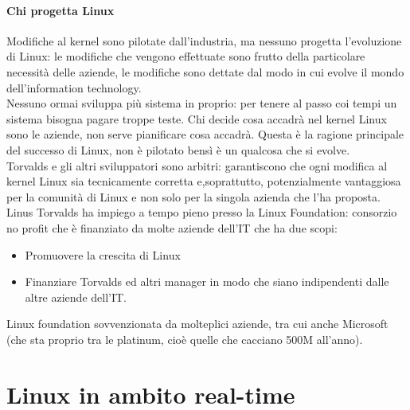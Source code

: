 \documentclass[12pt, oneside]{extbook}
\begin{document}
\subsubsection{Chi progetta Linux}
Modifiche al kernel sono pilotate dall'industria, ma nessuno progetta l'evoluzione di Linux: le modifiche che vengono effettuate sono frutto della particolare necessità delle aziende, le modifiche sono dettate dal modo in cui evolve il mondo dell'information technology.\\ Nessuno ormai sviluppa più sistema in proprio: per tenere al passo coi tempi un sistema bisogna pagare troppe teste. Chi decide cosa accadrà nel kernel Linux sono le aziende, non serve pianificare cosa accadrà. Questa è la ragione principale del successo di Linux, non è pilotato bensì è un qualcosa che si evolve.\\ Torvalds e gli altri sviluppatori sono arbitri: garantiscono che ogni modifica al kernel Linux sia tecnicamente corretta e,soprattutto, potenzialmente vantaggiosa per la comunità di Linux e non solo per la singola azienda che l'ha proposta.\\ Linus Torvalds ha impiego a tempo pieno presso la Linux Foundation: consorzio no profit che è finanziato da molte aziende dell'IT che ha due scopi:
\begin{itemize}
\item Promuovere la crescita di Linux
\item Finanziare Torvalds ed altri manager in modo che siano indipendenti dalle altre aziende dell'IT.
\end{itemize}
Linux foundation sovvenzionata da molteplici aziende, tra cui anche Microsoft (che sta proprio tra le platinum, cioè quelle che cacciano 500M all'anno).
\chapter{Linux in ambito real-time}
\end{document}
